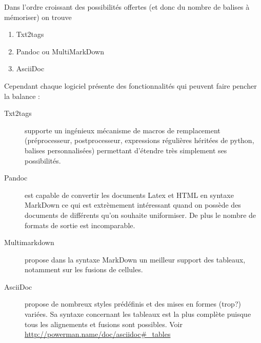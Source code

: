 \documentclass[]{article}
\begin{document}
Dans l'ordre croissant des possibilités offertes (et donc du nombre de
balises à mémoriser) on trouve

\begin{enumerate}[1.]
\item
  Txt2tags
\item
  Pandoc ou MultiMarkDown
\item
  AsciiDoc
\end{enumerate}
Cependant chaque logiciel présente des fonctionnalités qui peuvent faire
pencher la balance :

\begin{description}
\item[Txt2tags]
supporte un ingénieux mécanisme de macros de remplacement
(préprocesseur, postprocesseur, expressions régulières héritées de
python, balises personnalisées) permettant d'étendre très simplement ses
possibilités.

\item[Pandoc]
est capable de convertir les documents Latex et HTML en syntaxe MarkDown
ce qui est extrèmement intéressant quand on possède des documents de
différents qu'on souhaite uniformiser. De plus le nombre de formats de
sortie est incomparable.

\item[Multimarkdown]
propose dans la syntaxe MarkDown un meilleur support des tableaux,
notamment sur les fusions de cellules.

\item[AsciiDoc]
propose de nombreux styles prédéfinis et des mises en formes (trop?)
variées. Sa syntaxe concernant les tableaux est la plus complète puisque
tous les alignements et fusions sont possibles. Voir
\url{http://powerman.name/doc/asciidoc#_tables}

\end{description}
\end{document}
